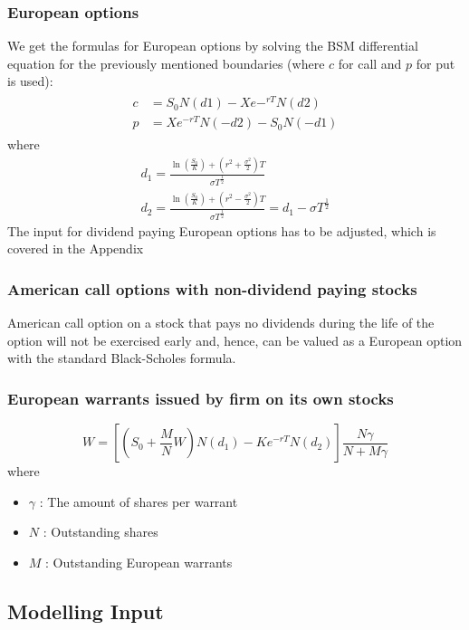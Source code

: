 \documentclass{article}
\begin{document}
\subsubsection{European options}
We get the formulas for European options by solving the BSM differential equation for the previously mentioned boundaries (where $c$ for call and $p$ for put is used):
\begin{align}
    \begin{split} \label{eq:38}
        c &= S_{0}N(d1) - X e-^{rT} N(d2) \\ 
        p &= X e^{-rT} N(-d2) - S_{0} N(-d1)
    \end{split}
\end{align}
where 
\begin{gather*}
        d_{1} = \frac{\ln\left(\frac{S_{0}}{K}\right)+\left(r^{2}+\frac{\sigma^{2}}{2}\right)T}{\sigma T^{\frac{1}{2}}} \\
        d_{2} = \frac{\ln\left(\frac{S_{0}}{K}\right)+\left(r^{2}-\frac{\sigma^{2}}{2}\right)T}{\sigma T^{\frac{1}{2}}} = d_{1} - \sigma T^{\frac{1}{2}}
\end{gather*}
The input for dividend paying European options has to be adjusted, which is covered in the Appendix
\subsubsection{American call options with non-dividend paying stocks}
American call option on a stock that pays no dividends during the life of the option will not be exercised early and, hence, can be valued as a European option with the standard Black-Scholes formula.
\subsubsection{European warrants issued by firm on its own stocks}
\begin{equation}
    W = \left[\left(S_{0} + \frac{M}{N}W\right)N(d_{1}) - Ke^{-rT}N(d_{2})\right]\frac{N\gamma}{N + M\gamma}
\end{equation}
where 
\begin{itemize}
    \item $\gamma$ : The amount of shares per warrant
    \item $N$ : Outstanding shares
    \item $M$ : Outstanding European warrants
\end{itemize}
\subsection{Modelling Input}
\end{document}
